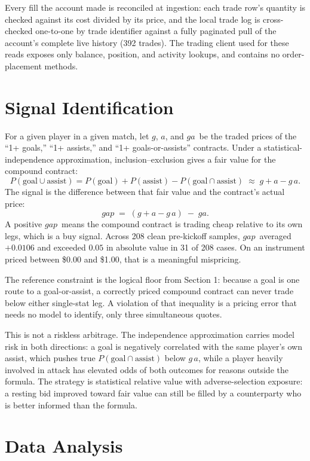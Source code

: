 \documentclass[12pt]{article}
\newcommand{\ga}{\ensuremath{\mathit{ga}}}
\newcommand{\gap}{\ensuremath{\mathit{gap}}}
\begin{document}
Every fill the account made is reconciled at ingestion: each trade row's quantity
is checked against its cost divided by its price, and the local trade log is
cross-checked one-to-one by trade identifier against a fully paginated pull of
the account's complete live history (392 trades). The trading client used for
these reads exposes only balance, position, and activity lookups, and contains no
order-placement methods.

\section{Signal Identification}

For a given player in a given match, let $g$, $a$, and \ga\ be the traded prices
of the ``1+ goals,'' ``1+ assists,'' and ``1+ goals-or-assists'' contracts. Under
a statistical-independence approximation, inclusion--exclusion gives a fair value
for the compound contract:
\[
P(\text{goal} \cup \text{assist}) = P(\text{goal}) + P(\text{assist}) - P(\text{goal} \cap \text{assist})
\;\approx\; g + a - g\,a .
\]
The signal is the difference between that fair value and the contract's actual
price:
\[
\gap \;=\; (g + a - g\,a) \;-\; \ga .
\]
A positive \gap\ means the compound contract is trading cheap relative to its own
legs, which is a buy signal. Across 208 clean pre-kickoff samples, \gap\ averaged
$+0.0106$ and exceeded $0.05$ in absolute value in 31 of 208 cases. On an
instrument priced between \$0.00 and \$1.00, that is a meaningful mispricing.

The reference constraint is the logical floor from Section 1: because a goal is
one route to a goal-or-assist, a correctly priced compound contract can never
trade below either single-stat leg. A violation of that inequality is a pricing
error that needs no model to identify, only three simultaneous quotes.

This is not a riskless arbitrage. The independence approximation carries model
risk in both directions: a goal is negatively correlated with the same player's
own assist, which pushes true $P(\text{goal} \cap \text{assist})$ below $g\,a$,
while a player heavily involved in attack has elevated odds of both outcomes for
reasons outside the formula. The strategy is statistical relative value with
adverse-selection exposure: a resting bid improved toward fair value can still be
filled by a counterparty who is better informed than the formula.

\section{Data Analysis}
\end{document}
